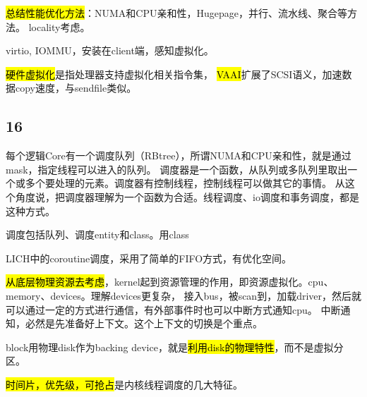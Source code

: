 \hrulefill

\hl{总结性能优化方法}：NUMA和CPU亲和性，Hugepage，并行、流水线、聚合等方法。
locality考虑。

virtio, IOMMU，安装在client端，感知虚拟化。

\hl{硬件虚拟化}是指处理器支持虚拟化相关指令集，
\hl{VAAI}扩展了SCSI语义，加速数据copy速度，与sendfile类似。

\subsection{16}

每个逻辑Core有一个调度队列（RBtree），所谓NUMA和CPU亲和性，就是通过mask，指定线程可以进入的队列。
调度器是一个函数，从队列或多队列里取出一个或多个要处理的元素。调度器有控制线程，控制线程可以做其它的事情。
从这个角度说，把调度器理解为一个函数为合适。线程调度、io调度和事务调度，都是这种方式。

调度包括队列、调度entity和class。用class

LICH中的coroutine调度，采用了简单的FIFO方式，有优化空间。

\hl{从底层物理资源去考虑}，kernel起到资源管理的作用，即资源虚拟化。cpu、memory、devices。理解devices更复杂，
接入bus，被scan到，加载driver，然后就可以通过一定的方式进行通信，有外部事件时也可以中断方式通知cpu。
中断通知，必然是先准备好上下文。这个上下文的切换是个重点。

block用物理disk作为backing device，就是\hl{利用disk的物理特性}，而不是虚拟分区。

\hl{时间片，优先级，可抢占}是内核线程调度的几大特征。
